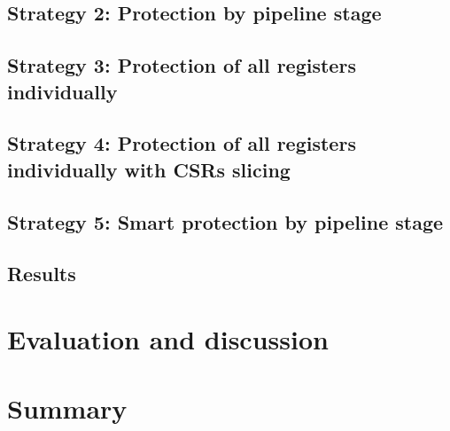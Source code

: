 \subsection{Strategy 2: Protection by pipeline stage}

\subsection{Strategy 3: Protection of all registers individually}

\subsection{Strategy 4: Protection of all registers individually with CSRs slicing}

\subsection{Strategy 5: Smart protection by pipeline stage}

\subsection{Results}


\section{Evaluation and discussion}
\label{section:chap6_discussion}


\section{Summary}


